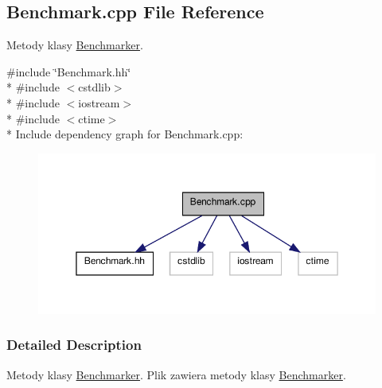 \hypertarget{a00005}{\subsection{Benchmark.\-cpp File Reference}
\label{a00005}
}


Metody klasy \hyperlink{a00001}{Benchmarker}.  


{\ttfamily \#include \char`\"{}Benchmark.\-hh\char`\"{}}\\*
{\ttfamily \#include $<$cstdlib$>$}\\*
{\ttfamily \#include $<$iostream$>$}\\*
{\ttfamily \#include $<$ctime$>$}\\*
Include dependency graph for Benchmark.\-cpp\-:\nopagebreak
\begin{figure}[H]
\begin{center}
\leavevmode
\includegraphics[width=350pt]{a00016}
\end{center}
\end{figure}


\subsubsection{Detailed Description}
Metody klasy \hyperlink{a00001}{Benchmarker}. Plik zawiera metody klasy \hyperlink{a00001}{Benchmarker}. 